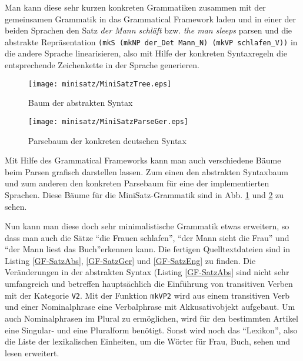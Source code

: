 \documentclass[fontsize=12pt,abstract=on,titlepage,bibliography=totoc,ngerman,listof=totoc]{scrreprt}
\begin{document}
Man kann diese sehr kurzen konkreten Grammatiken zusammen mit der gemeinsamen Grammatik in das Grammatical Framework laden und in einer der beiden Sprachen den Satz \textit{der Mann schläft} bzw. \textit{the man sleeps} parsen und die abstrakte Repräsentation \texttt{(mkS (mkNP der\_Det Mann\_N) (mkVP schlafen\_V))} in die andere Sprache linearisieren, also mit Hilfe der konkreten Syntaxregeln die entsprechende Zeichenkette in der Sprache generieren. \par
\begin{figure}
\texttt{[image: minisatz/MiniSatzTree.eps]}
\caption{Baum der abstrakten Syntax}\label{MiniSatz-AbsTree}
\end{figure}
\begin{figure}
\texttt{[image: minisatz/MiniSatzParseGer.eps]}
\caption{Parsebaum der konkreten deutschen Syntax}\label{MiniSatz-ParseGer}
\end{figure}
Mit Hilfe des Grammatical Frameworks kann man auch verschiedene Bäume beim Parsen grafisch darstellen lassen. Zum einen den abstrakten Syntaxbaum und zum anderen den konkreten Parsebaum für eine der implementierten Sprachen. Diese Bäume für die MiniSatz-Grammatik sind in Abb. \ref{MiniSatz-AbsTree} und \ref{MiniSatz-ParseGer} zu sehen.

Nun kann man diese doch sehr minimalistische Grammatik etwas erweitern, so dass man auch die Sätze ``die Frauen schlafen'', ``der Mann sieht die Frau'' und ``der Mann liest das Buch''erkennen kann. Die fertigen Quelltextdateien sind in Listing \ref{GF-SatzAbs}, \ref{GF-SatzGer} und \ref{GF-SatzEng} zu finden. Die Veränderungen in der abstrakten Syntax (Listing \ref{GF-SatzAbs} sind nicht sehr umfangreich und betreffen hauptsächlich die Einführung von transitiven Verben mit der Kategorie \texttt{V2}. Mit der Funktion \texttt{mkVP2} wird aus einem transitiven Verb und einer Nominalphrase eine Verbalphrase mit Akkusativobjekt aufgebaut. Um auch Nominalphrasen im Plural zu ermöglichen, wird für den bestimmten Artikel eine Singular- und eine Pluralform benötigt. Sonst wird noch das ``Lexikon'', also die Liste der lexikalischen Einheiten, um die Wörter für Frau, Buch, sehen und lesen erweitert. \par

\end{document}
